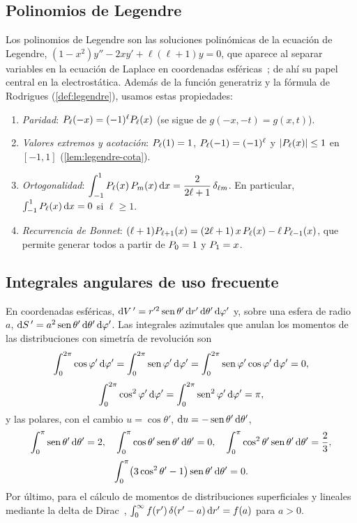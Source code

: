 \subsection{Polinomios de Legendre}\label{app:legendre}
Los polinomios de Legendre son las soluciones polinómicas de la ecuación de Legendre, $(1-x^{2})y''-2xy'+\ell(\ell+1)y=0$, que aparece al separar variables en la ecuación de
Laplace en coordenadas esféricas~\cite{ARFKEN,JACKSON}; de ahí su papel central en la electrostática. Además de la función generatriz y la fórmula de Rodrigues
(\cref{def:legendre}), usamos estas propiedades:
\begin{enumerate}[label=(\alph*)]
  \item \emph{Paridad}: $P_{\ell}(-x)=(-1)^{\ell}P_{\ell}(x)$ (se sigue de $g(-x,-t)=g(x,t)$).
  \item \emph{Valores extremos y acotación}: $P_{\ell}(1)=1$, $P_{\ell}(-1)=(-1)^{\ell}$ y $\lvert P_{\ell}(x)\rvert\le1$ en $[-1,1]$ (\cref{lem:legendre-cota}).
  \item \emph{Ortogonalidad}: $\displaystyle\int_{-1}^{1}P_{\ell}(x)\,P_{m}(x)\,\mathrm{d} x=\frac{2}{2\ell+1}\,\delta_{\ell m}$. En particular, $\int_{-1}^{1}P_{\ell}(x)\,\mathrm{d} x=0$ si $\ell\ge1$.
  \item \emph{Recurrencia de Bonnet}: $(\ell+1)P_{\ell+1}(x)=(2\ell+1)\,x\,P_{\ell}(x)-\ell\,P_{\ell-1}(x)$, que permite generar todos a partir de $P_{0}=1$ y $P_{1}=x$.
\end{enumerate}



\subsection{Integrales angulares de uso frecuente}\label{app:integrales}
En coordenadas esféricas, $\mathrm{d} V\,'=r'^{2}\operatorname{sen}\theta'\,\mathrm{d} r'\,\mathrm{d}\theta'\,\mathrm{d}\varphi'$ y, sobre una esfera de radio $a$, $\mathrm{d} S\,'=a^{2}\operatorname{sen}\theta'\,\mathrm{d}\theta'\,\mathrm{d}\varphi'$. Las integrales azimutales
que anulan los momentos de las distribuciones con simetría de revolución son
\[
  \int_{0}^{2\pi}\cos\varphi'\,\mathrm{d}\varphi'=\int_{0}^{2\pi}\operatorname{sen}\varphi'\,\mathrm{d}\varphi'=\int_{0}^{2\pi}\operatorname{sen}\varphi'\cos\varphi'\,\mathrm{d}\varphi'=0,
\]
\[
  \int_{0}^{2\pi}\cos^{2}\varphi'\,\mathrm{d}\varphi'=\int_{0}^{2\pi}\operatorname{sen}^{2}\varphi'\,\mathrm{d}\varphi'=\pi ,
\]
y las polares, con el cambio $u=\cos\theta'$, $\mathrm{d} u=-\operatorname{sen}\theta'\,\mathrm{d}\theta'$,
\[
  \int_{0}^{\pi}\operatorname{sen}\theta'\,\mathrm{d}\theta'=2,\quad
  \int_{0}^{\pi}\cos\theta'\operatorname{sen}\theta'\,\mathrm{d}\theta'=0,\quad
  \int_{0}^{\pi}\cos^{2}\theta'\operatorname{sen}\theta'\,\mathrm{d}\theta'=\frac23,
\]
\[
  \int_{0}^{\pi}\bigl(3\cos^{2}\theta'-1\bigr)\operatorname{sen}\theta'\,\mathrm{d}\theta'=0 .
\]
Por último, para el cálculo de momentos de distribuciones superficiales y lineales mediante la delta de Dirac~\cite{TEMA0,TEMA1},
$\int_{0}^{\infty}f(r')\,\delta(r'-a)\,\mathrm{d} r'=f(a)$ para $a>0$.
